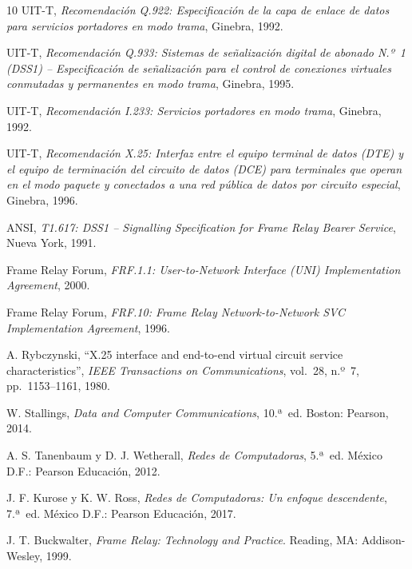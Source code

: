 \documentclass[12pt,a4paper]{article}
\begin{document}
\begin{thebibliography}{10}
    UIT-T, \textit{Recomendación Q.922: Especificación de la capa de enlace de datos para servicios portadores en modo trama}, Ginebra, 1992.

    UIT-T, \textit{Recomendación Q.933: Sistemas de señalización digital de abonado N.º~1 (DSS1) -- Especificación de señalización para el control de conexiones virtuales conmutadas y permanentes en modo trama}, Ginebra, 1995.

    UIT-T, \textit{Recomendación I.233: Servicios portadores en modo trama}, Ginebra, 1992.

    UIT-T, \textit{Recomendación X.25: Interfaz entre el equipo terminal de datos (DTE) y el equipo de terminación del circuito de datos (DCE) para terminales que operan en el modo paquete y conectados a una red pública de datos por circuito especial}, Ginebra, 1996.

    ANSI, \textit{T1.617: DSS1 -- Signalling Specification for Frame Relay Bearer Service}, Nueva York, 1991.

    Frame Relay Forum, \textit{FRF.1.1: User-to-Network Interface (UNI) Implementation Agreement}, 2000.

    Frame Relay Forum, \textit{FRF.10: Frame Relay Network-to-Network SVC Implementation Agreement}, 1996.

    A. Rybczynski, ``X.25 interface and end-to-end virtual circuit service characteristics'', \textit{IEEE Transactions on Communications}, vol.~28, n.º~7, pp.~1153--1161, 1980.

    W. Stallings, \textit{Data and Computer Communications}, 10.ª~ed. Boston: Pearson, 2014.

    A. S. Tanenbaum y D. J. Wetherall, \textit{Redes de Computadoras}, 5.ª~ed. México D.F.: Pearson Educación, 2012.

    J. F. Kurose y K. W. Ross, \textit{Redes de Computadoras: Un enfoque descendente}, 7.ª~ed. México D.F.: Pearson Educación, 2017.

    J. T. Buckwalter, \textit{Frame Relay: Technology and Practice}. Reading, MA: Addison-Wesley, 1999.


\end{thebibliography}
\end{document}
